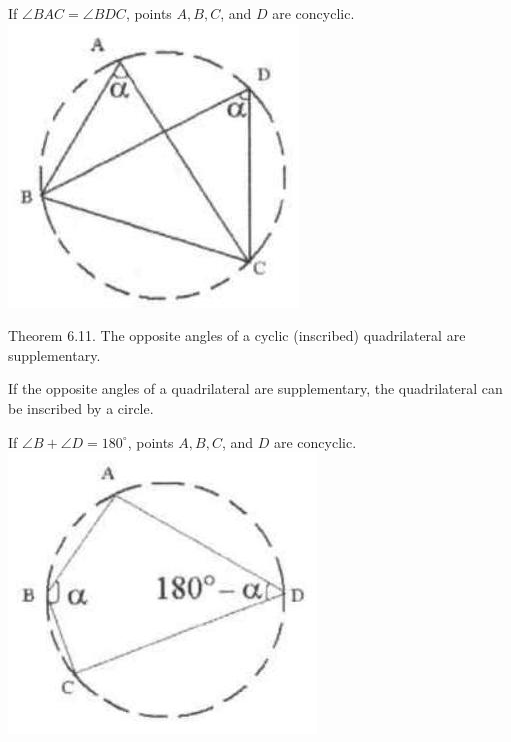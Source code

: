 \documentclass[10pt]{article}
\begin{document}
If \(\angle B A C=\angle B D C\), points \(A, B, C\), and \(D\) are concyclic.\\
\includegraphics[max width=\textwidth, center]{2025_04_17_97bc1f7e44d93c271a88g-191(2)}

Theorem 6.11. The opposite angles of a cyclic (inscribed) quadrilateral are supplementary.

If the opposite angles of a quadrilateral are supplementary, the quadrilateral can be inscribed by a circle.

If \(\angle B+\angle D=180^{\circ}\), points \(A, B, C\), and \(D\) are concyclic.\\
\includegraphics[max width=\textwidth, center]{2025_04_17_97bc1f7e44d93c271a88g-191(1)}
\end{document}
